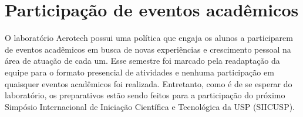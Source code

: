 \chapter{Participação de eventos acadêmicos}\label{chp:disseminacao}

O laboratório Aerotech possui uma política que engaja os alunos a participarem de eventos acadêmicos em busca de novas experiências e crescimento pessoal na área de atuação de cada um. Esse semestre foi marcado pela readaptação da equipe para o formato presencial de atividades e nenhuma participação em quaisquer eventos acadêmicos foi realizada. Entretanto, como é de se esperar do laboratório, os preparativos estão sendo feitos para a participação do próximo Simpósio Internacional de Iniciação Científica e Tecnológica da USP (SIICUSP).